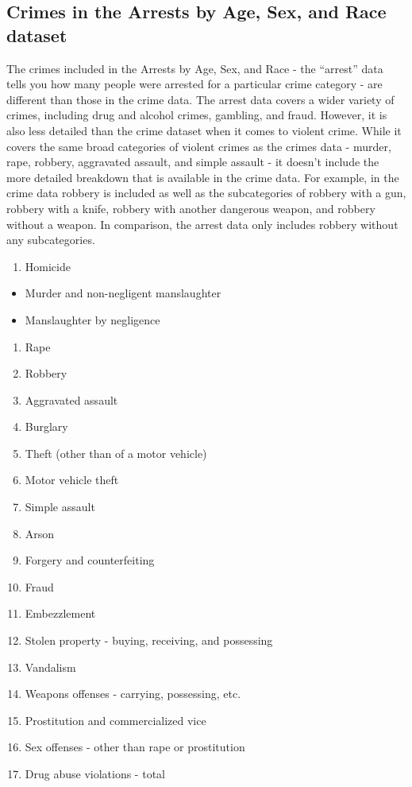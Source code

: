 \documentclass[
  12pt,
  openany]{book}
\providecommand{\tightlist}{%
  \setlength{\itemsep}{0pt}\setlength{\parskip}{0pt}}
\begin{document}
\hypertarget{crimes-in-the-arrests-by-age-sex-and-race-dataset}{%
\subsection{Crimes in the Arrests by Age, Sex, and Race dataset}\label{crimes-in-the-arrests-by-age-sex-and-race-dataset}}

The crimes included in the Arrests by Age, Sex, and Race - the ``arrest'' data tells you how many people were arrested for a particular crime category - are different than those in the crime data. The arrest data covers a wider variety of crimes, including drug and alcohol crimes, gambling, and fraud. However, it is also less detailed than the crime dataset when it comes to violent crime. While it covers the same broad categories of violent crimes as the crimes data - murder, rape, robbery, aggravated assault, and simple assault - it doesn't include the more detailed breakdown that is available in the crime data. For example, in the crime data robbery is included as well as the subcategories of robbery with a gun, robbery with a knife, robbery with another dangerous weapon, and robbery without a weapon. In comparison, the arrest data only includes robbery without any subcategories.

\begin{enumerate}
\def\labelenumi{\arabic{enumi}.}
\tightlist
\item
  Homicide
\end{enumerate}

\begin{itemize}
\tightlist
\item
  Murder and non-negligent manslaughter
\item
  Manslaughter by negligence
\end{itemize}

\begin{enumerate}
\def\labelenumi{\arabic{enumi}.}
\setcounter{enumi}{1}
\tightlist
\item
  Rape
\item
  Robbery
\item
  Aggravated assault
\item
  Burglary
\item
  Theft (other than of a motor vehicle)
\item
  Motor vehicle theft
\item
  Simple assault
\item
  Arson
\item
  Forgery and counterfeiting
\item
  Fraud
\item
  Embezzlement
\item
  Stolen property - buying, receiving, and possessing
\item
  Vandalism
\item
  Weapons offenses - carrying, possessing, etc.
\item
  Prostitution and commercialized vice
\item
  Sex offenses - other than rape or prostitution
\item
  Drug abuse violations - total
\end{enumerate}
\end{document}
